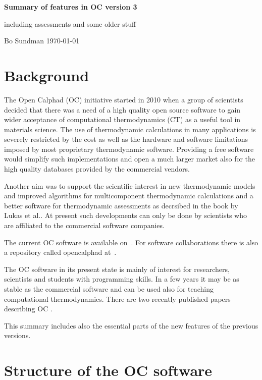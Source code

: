 \documentclass[12pt]{article}
\begin{document}
\begin{center}
{\Large \bf Summary of features in OC version 3 

including assessments and some older stuff

}

\bigskip

Bo Sundman \today

\end{center}

\section{Background}

The Open Calphad (OC) initiative started in 2010 when a group of
scientists decided that there was a need of a high quality open source
software to gain wider acceptance of computational thermodynamics (CT)
as a useful tool in materials science.  The use of thermodynamic
calculations in many applications is severely restricted by the cost
as well as the hardware and software limitations imposed by most
proprietary thermodynamic software.  Providing a free software would
simplify such implementations and open a much larger market also for
the high quality databases provided by the commercial vendors.

Another aim was to support the scientific interest in new
thermodynamic models and improved algorithms for multicomponent
thermodynamic calculations and a better software for thermodynamic
assessments as decrsibed in the book by Lukas et al.\cite{07Luk}.  At
present such developments can only be done by scientists who are
affiliated to the commercial software companies.

The current OC software is available on~\cite{ocweb}.  For software
collaborations there is also a repository called opencalphad
at~\cite{github}.

The OC software in its present state is mainly of interest for
researchers, scientists and students with programming skills.  In a
few years it may be as stable as the commercial software and can be
used also for teaching computational thermodynamics.  There are two
recently published papers describing OC \cite{15Sun1,15Sun2}.

This summary includes also the essential parts of the new features of
the previous versions.

\section{Structure of the OC software}
\end{document}
